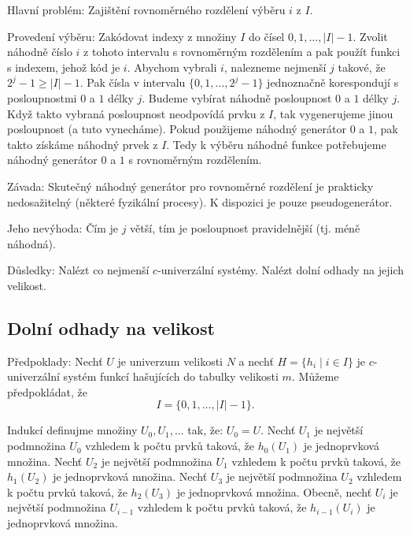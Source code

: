 \documentclass[a4paper,12pt]{article}
\begin{document}
Hlavní problém: Zajištění rovnoměrného rozdělení 
výběru $i$ z $I$.

Provedení výběru: Zak\'odovat indexy z množiny $
I$ do 
čísel $0,1,\dots,|I|-1$. Zvolit náhodně číslo $
i$ z tohoto 
intervalu s rovnoměrným rozdělením a pak použít 
funkci s indexem, jehož k\'od je $i$. Abychom vybrali $i$, nalezneme 
nejmenší $j$ takové, že $2^j-1\ge |I|-1$. Pak čísla v 
intervalu $\{0,1,\dots,2^j-1\}$ jednoznačně korespondují s 
posloupnostmi $0$ a $1$ délky $j$. Budeme vybírat náhodně 
posloupnost $0$ a $1$ délky $j$. Když takto vybraná posloupnost neodpovídá prvku z $I$, tak vygenerujeme jinou posloupnost (a tuto vynecháme). Pokud použijeme náhodný generátor $0$ a $1$, pak takto získáme náhodný prvek z $I$. Tedy k výběru náhodné funkce potřebujeme  
náhodný generátor $0$ a $1$ s rovnoměrným rozděle\-ním.

Závada: Skutečný náhodný generátor pro 
rovnoměrné rozděle\-ní je prakticky nedosažitelný 
(některé fyzikální procesy). K dispozici je pouze 
pseudogenerátor. 

Jeho nevýhoda: \v Cím je $j$ větší, tím je 
posloupnost pravidelnější (tj. méně náhodná). 

Důsledky: Nalézt co nejmenší $c$-univerzální 
systémy. Nalézt dolní odhady na jejich velikost.

\subsection{
Dolní odhady na velikost
}

Předpoklady: Nechť $U$ je univerzum velikosti $N$ a nechť 
$H=\{h_i\mid i\in I\}$ je $c$-univerzální systém funkcí hašujících do tabulky velikosti 
$m$. Můžeme předpoklá\-dat, že 
$$I=\{0,1,\dots,|I|-1\}.$$

Indukcí definujme množiny $U_0,U_1,\dots$ tak, že: 
$U_0=U$.\newline 
Nechť $U_1$ je největší podmnožina $U_0$ vzhledem k počtu 
prvků taková, že $h_0(U_1)$ je jednoprvková 
množina. \newline 
Nechť $U_2$ je největší podmnožina $U_1$ vzhledem k počtu 
prvků taková, že $h_1(U_2)$ je jednoprvková 
množina. \newline 
Nechť $U_3$ je největší podmnožina $U_2$ vzhledem k počtu 
prvků taková, že $h_2(U_3)$ je jednoprvková 
množina. \newline 
Obecně, nechť $U_i$ je největší podmnožina $U_{
i-1}$ vzhledem k počtu 
prvků taková, že $h_{i-1}(U_i)$ je jednoprvková 
množina. 
\end{document}
